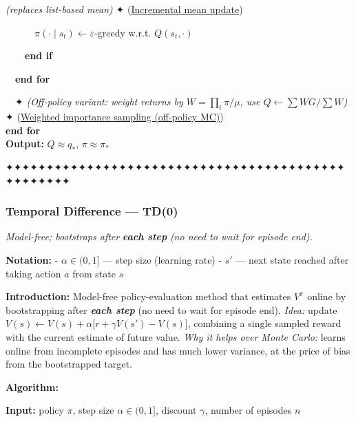 \documentclass[11pt]{article}
\begin{document}
\begin{pseudobox}
\emph{(replaces list-based mean)} ✦ (\hyperref[trick-2-1-1]{Incremental
mean update})\\
\strut ~~~~~~\(\pi(\cdot \mid s_t) \leftarrow \varepsilon\)-greedy
w.r.t. \(Q(s_t, \cdot)\)\\
\strut ~~~~\textbf{end if}\\
\strut ~~\textbf{end for}\\
\strut ~~✦ \emph{(Off-policy variant: weight returns by
\(W=\prod_t \pi/\mu\), use \(Q \leftarrow \sum WG / \sum W\))} ✦
(\hyperref[trick-2-1-5]{Weighted importance sampling (off-policy MC)})\\
\textbf{end for}\\
\textbf{Output:} \(Q \approx q_{*}\), \(\pi \approx \pi_{*}\)

\end{pseudobox}

    ✦✦✦✦✦✦✦✦✦✦✦✦✦✦✦✦✦✦✦✦✦✦✦✦✦✦✦✦✦✦✦✦✦✦✦✦✦✦✦✦✦✦✦✦✦✦✦✦✦✦

    \clearpage

\label{td-0}

    \subsubsection{Temporal Difference ---
TD(0)}\label{temporal-difference-td0}

    \emph{Model-free; bootstraps after} \textbf{\emph{each step}} \emph{(no
need to wait for episode end).}

    \textbf{Notation:} - \(\alpha \in (0,1]\) --- step size (learning rate)
- \(s'\) --- next state reached after taking action \(a\) from state
\(s\)

    \label{intro-2-2}

    \textbf{Introduction:} Model-free policy-evaluation method that
estimates \(V^\pi\) online by bootstrapping after \textbf{\emph{each
step}} (no need to wait for episode end). \emph{Idea:} update
\(V(s) \leftarrow V(s) + \alpha\bigl[r + \gamma V(s') - V(s)\bigr]\),
combining a single sampled reward with the current estimate of future
value. \emph{Why it helps over Monte Carlo:} learns online from
incomplete episodes and has much lower variance, at the price of bias
from the bootstrapped target.

    \textbf{Algorithm:}

\textbf{Input:} policy \(\pi\), step size \(\alpha \in (0,1]\), discount
\(\gamma\), number of episodes \(n\)
\end{document}
